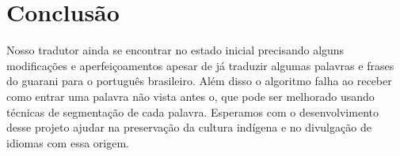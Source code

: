 \documentclass[12pt]{article}
\begin{document}
\section{Conclusão}\label{sec:figs}


Nosso tradutor ainda se encontrar no estado inicial precisando alguns modificações e aperfeiçoamentos apesar de já traduzir algumas palavras e frases do guarani para o português brasileiro. Além disso o algoritmo falha ao receber como entrar uma palavra não vista antes o, que pode ser melhorado usando técnicas de segmentação de cada palavra. Esperamos com o desenvolvimento desse projeto ajudar na preservação da cultura indígena e no divulgação de idiomas com essa origem.


\end{document}
